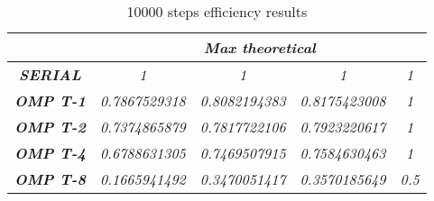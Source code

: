 \begin{table}
    \centering
    \begin{tabular}{|c|c|c|c|c|} 
    \hline
                                                    & \multicolumn{4}{c|}{\textbf{\textit{Max theoretical}}}                                                                                                                    \\ 
    \hline
    \textbf{\textit{SERIAL}}                        & \textit{1}                                 & \textit{1}                                 & \textit{1}                                 & \textit{1}                         \\ 
    \hline
    \textbf{\textit{OMP T-1}}                       & \textit{0.7867529318}                      & \textit{0.8082194383}                      & \textit{0.8175423008}                      & \textit{1}                         \\ 
    \hline
    \textbf{\textit{OMP T-2}}                       & \textit{0.7374865879}                      & \textit{0.7817722106}                      & \textit{0.7923220617}                      & \textit{1}                         \\ 
    \hline
    \textbf{\textit{OMP T-4}}                       & \textit{0.6788631305}                      & \textit{0.7469507915}                      & \textit{0.7584630463}                      & \textit{1}                         \\ 
    \hline
    \multicolumn{1}{|l|}{\textbf{\textit{OMP T-8}}} & \multicolumn{1}{l|}{\textit{0.1665941492}} & \multicolumn{1}{l|}{\textit{0.3470051417}} & \multicolumn{1}{l|}{\textit{0.3570185649}} & \multicolumn{1}{l|}{\textit{0.5}}  \\
    \hline
    \end{tabular}
    \caption{10000 steps efficiency results}
\end{table}